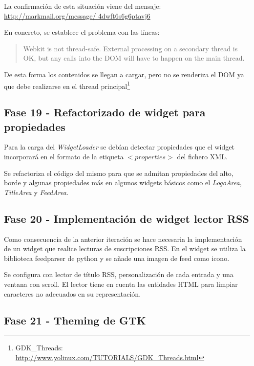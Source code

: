 La confirmación de esta situación viene del mensaje:\\
\url{http://markmail.org/message/
4dwft6s6g6ptavj6}

En concreto, se establece el problema con las líneas:

\begin{quote}
    \small Webkit is not thread-safe. External processing  
            on a secondary thread is OK, but any calls into the DOM will have  
            to happen on the main thread.
\end{quote}

De esta forma los contenidos se llegan a cargar, pero no se renderiza el DOM ya
que debe realizarse en el thread
principal\footnote{GDK\_Threads: \\
\url{http://www.yolinux.com/TUTORIALS/GDK\_Threads.html}}

\subsection{Fase 19 - Refactorizado de widget para propiedades}

Para la carga del \emph{WidgetLoader} se debían detectar propiedades que el
widget incorporará en el formato de la etiqueta $<properties>$ del fichero XML.

Se refactoriza el código del mismo para que se admitan propiedades del alto,
borde y algunas propiedades más en algunos widgets básicos como el
\emph{LogoArea}, \emph{TitleArea} y \emph{FeedArea}.

\newpage

\subsection{Fase 20 - Implementación de widget lector RSS}

Como consecuencia de la anterior iteración se hace necesaria la implementación
de un widget que realice lecturas de suscripciones RSS. En el widget se utiliza
la biblioteca feedparser de python y se añade una imagen de feed como icono.

Se configura con lector de título RSS, personalización de cada entrada y una
ventana con scroll. El lector tiene en cuenta las entidades HTML para limpiar
caracteres no adecuados en su representación.

\subsection{Fase 21 - Theming de GTK}

